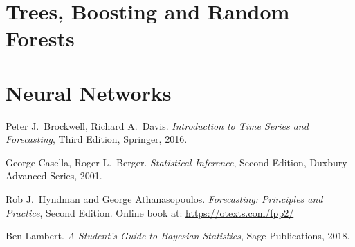 \documentclass[11pt,a4]{article}
\theoremstyle{definition}
\begin{document}
\section{Trees, Boosting and Random Forests}

\section{Neural Networks}

\begin{thebibliography}{99}

 Peter J.~Brockwell, Richard A.~Davis. 
\emph{Introduction to Time Series and Forecasting}, Third Edition, Springer, 
2016. 

 George Casella, Roger L.~Berger. \emph{Statistical Inference}, 
Second Edition, Duxbury Advanced Series, 2001.

 Rob J.~Hyndman and George Athanasopoulos. \emph{Forecasting: 
Principles and Practice}, Second Edition. Online book at: 
\url{https://otexts.com/fpp2/}

 Ben Lambert. \emph{A Student's Guide to Bayesian Statistics}, 
Sage Publications, 2018. 

\end{thebibliography}
\end{document}
